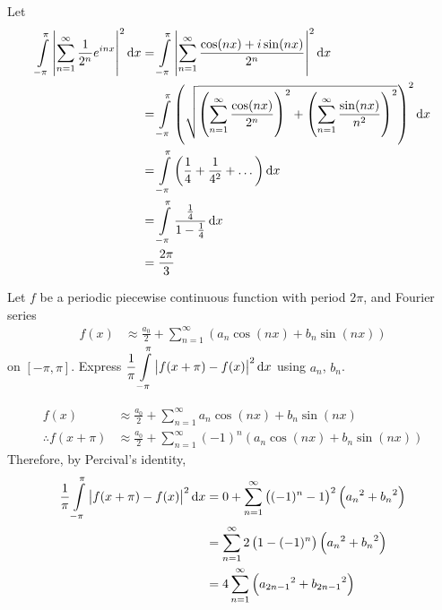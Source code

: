 \documentclass[fleqn, a4paper, 11pt, oneside]{amsart}
\theoremstyle{definition}
\theoremstyle{theorem}
\begin{document}
\begin{solution}
	Let
	\begin{align*}
		\int\limits_{-\pi}^{\pi} \left| \sum\limits_{n = 1}^{\infty} \frac{1}{2^n} e^{i n x} \right|^2 \dif x &= \int\limits_{-\pi}^{\pi} \left| \sum\limits_{n = 1}^{\infty} \frac{\cos(n x) + i \sin(n x)}{2^n} \right|^2 \dif x\\
		&= \int\limits_{-\pi}^{\pi} \left( \sqrt{\left( \sum\limits_{n = 1}^{\infty} \frac{\cos(n x)}{2^n} \right)^2 + \left( \sum\limits_{n = 1}^{\infty} \frac{\sin(n x)}{n^2} \right)^2} \right)^2 \dif x\\
		&= \int\limits_{-\pi}^{\pi} \left( \frac{1}{4} + \frac{1}{4^2} + \dots \right) \dif x\\
		&= \int\limits_{-\pi}^{\pi} \frac{\frac{1}{4}}{1 - \frac{1}{4}} \dif x\\
		&= \frac{2 \pi}{3}
	\end{align*}
\end{solution}

\begin{question}
	Let $f$ be a periodic piecewise continuous function with period $2 \pi$, and Fourier series
	\begin{align*}
		f(x) &\approx \frac{a_0}{2} + \sum\limits_{n = 1}^{\infty} \left( a_n \cos(n x) + b_n \sin(n x) \right)
	\end{align*}
	on $[-\pi,\pi]$.
	Express $\displaystyle \frac{1}{\pi} \int\limits_{-\pi}^{\pi} \left| f(x + \pi) - f(x) \right|^2 \dif x$ using $a_n$, $b_n$.
\end{question}

\begin{solution}
	\begin{align*}
		f(x) &\approx \frac{a_0}{2} + \sum\limits_{n = 1}^{\infty} a_n \cos(n x) + b_n \sin(n x)\\
		\therefore f(x + \pi) &\approx \frac{a_0}{2} + \sum\limits_{n = 1}^{\infty} (-1)^n \left( a_n \cos(n x) + b_n \sin(n x) \right)
	\end{align*}
	Therefore, by Percival's identity,
	\begin{align*}
		\frac{1}{\pi} \int\limits_{-\pi}^{\pi} \left| f(x + \pi) - f(x) \right|^2 \dif x &= 0 + \sum\limits_{n = 1}^{\infty} \left( (-1)^n - 1 \right)^2 \left( {a_n}^2 + {b_n}^2 \right)\\
		&= \sum\limits_{n = 1}^{\infty} 2 \left( 1 - (-1)^n \right) \left( {a_n}^2 + {b_n}^2 \right)\\
		&= 4 \sum\limits_{n = 1}^{\infty} \left( {a_{2 n - 1}}^2 + {b_{2 n - 1}}^2 \right)
	\end{align*}
\end{solution}
\end{document}
